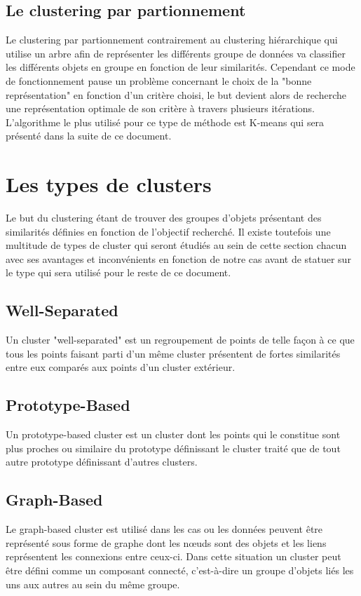 \documentclass[memoire.tex]{subfiles}
\begin{document}
\newpage
\subsection{Le clustering par partionnement}
Le clustering par partionnement contrairement au clustering hiérarchique qui utilise un arbre afin de représenter les différents groupe de données va classifier les différents objets en groupe en fonction de leur similarités. Cependant ce mode de fonctionnement pause un problème concernant le choix de la "bonne représentation" en fonction d'un critère choisi, le but devient alors de recherche une représentation optimale de son critère à travers plusieurs itérations.\cite{ref8} L'algorithme le plus utilisé pour ce type de méthode est K-means qui sera présenté dans la suite de ce document.

\section{Les types de clusters}

Le but du clustering étant de trouver des groupes d'objets présentant des similarités
définies en fonction de l'objectif recherché. Il existe toutefois une multitude de types de cluster qui seront étudiés au sein de cette section chacun avec ses avantages et inconvénients en fonction de notre cas avant de statuer sur le type qui sera utilisé pour le reste de ce document.

\subsection{Well-Separated}
Un cluster "well-separated" est un regroupement de points de telle façon à ce que tous les points faisant parti d'un même cluster présentent de fortes similarités entre eux comparés aux points d'un cluster extérieur.
\subsection{Prototype-Based}

Un prototype-based cluster est un cluster dont les points qui le constitue sont plus proches ou similaire du prototype définissant le cluster traité que de tout autre prototype définissant d'autres clusters.

\subsection{Graph-Based}
Le graph-based cluster est utilisé dans les cas ou les données peuvent être représenté sous forme de graphe dont les nœuds sont des objets et les liens représentent les connexions entre ceux-ci. Dans cette situation un cluster peut être défini comme un composant connecté,  c'est-à-dire un groupe d'objets liés les uns aux autres au sein du même groupe.
\end{document}
